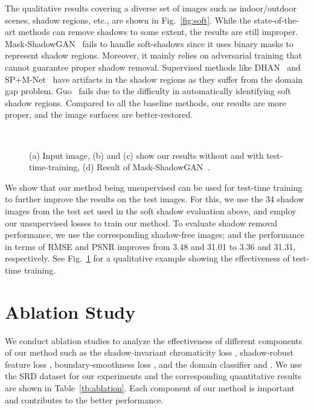 \documentclass[10pt,twocolumn,letterpaper]{article}
\begin{document}
The qualitative results covering a diverse set of images such as indoor/outdoor scenes, shadow regions, etc., are shown in Fig.~\ref{fig:soft}.
While the state-of-the-art methods can remove shadows to some extent, the results are still improper.
Mask-ShadowGAN~\cite{Hu19} fails to handle soft-shadows since it uses binary masks to represent shadow regions. Moreover, it mainly relies on adversarial training that cannot guarantee proper shadow removal. 
Supervised methods like DHAN~\cite{Cun20} and SP+M-Net~\cite{Le19} have artifacts in the shadow regions as they suffer from the domain gap problem.  
Guo~\cite{Guo12} fails due to the difficulty in automatically identifying soft shadow regions.
Compared to all the baseline methods, our results are more proper, and the image surfaces are better-restored. 


\begin{figure}[t]
	\centering
	\captionsetup[subfloat]{farskip=2pt}
	\hfill
	\hfill
	\hfill
	\hfill\\
	\vspace{-0.01in}
	\caption{ (a) Input image, (b) and (c) show our results without and with test-time-training, (d) Result of Mask-ShadowGAN~\cite{Hu19}.}
	\label{fig:testtime}
\end{figure}

\vspace{0.2cm}
We show that our method being unsupervised can be used for test-time training to further improve the results on the test images. For this, we use the 34 shadow images from the test set used in the soft shadow evaluation above, and employ our unsupervised losses to train our method.
To evaluate shadow removal performance, we use the corresponding shadow-free images; and the performance in terms of RMSE and PSNR improves from 3.48 and 31.01 to 3.36 and 31.31, respectively. 
See Fig.~\ref{fig:testtime} for a qualitative example showing the effectiveness of test-time training. 
\section{Ablation Study}
\label{sec:ablation}
We conduct ablation studies to analyze the effectiveness of different components of our method such as the shadow-invariant chromaticity loss , shadow-robust feature loss , boundary-smoothness loss , and the domain classifier  and . We use the SRD dataset for our experiments and the corresponding quantitative results are shown in Table~\ref{tb:ablation}. Each component of our method is important and contributes to the better performance.
\end{document}
